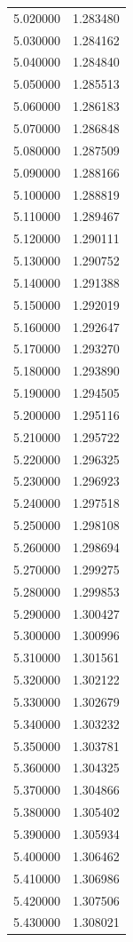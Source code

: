 \begin{tabular}{rr}
5.020000 & 1.283480 \\
5.030000 & 1.284162 \\
5.040000 & 1.284840 \\
5.050000 & 1.285513 \\
5.060000 & 1.286183 \\
5.070000 & 1.286848 \\
5.080000 & 1.287509 \\
5.090000 & 1.288166 \\
5.100000 & 1.288819 \\
5.110000 & 1.289467 \\
5.120000 & 1.290111 \\
5.130000 & 1.290752 \\
5.140000 & 1.291388 \\
5.150000 & 1.292019 \\
5.160000 & 1.292647 \\
5.170000 & 1.293270 \\
5.180000 & 1.293890 \\
5.190000 & 1.294505 \\
5.200000 & 1.295116 \\
5.210000 & 1.295722 \\
5.220000 & 1.296325 \\
5.230000 & 1.296923 \\
5.240000 & 1.297518 \\
5.250000 & 1.298108 \\
5.260000 & 1.298694 \\
5.270000 & 1.299275 \\
5.280000 & 1.299853 \\
5.290000 & 1.300427 \\
5.300000 & 1.300996 \\
5.310000 & 1.301561 \\
5.320000 & 1.302122 \\
5.330000 & 1.302679 \\
5.340000 & 1.303232 \\
5.350000 & 1.303781 \\
5.360000 & 1.304325 \\
5.370000 & 1.304866 \\
5.380000 & 1.305402 \\
5.390000 & 1.305934 \\
5.400000 & 1.306462 \\
5.410000 & 1.306986 \\
5.420000 & 1.307506 \\
5.430000 & 1.308021 \\

\end{tabular}
